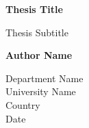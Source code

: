 \begin{titlepage}
    \begin{center}
        \vspace*{1cm}
            
        \Huge
        \textbf{Thesis Title}
            
        \vspace{0.5cm}
        \LARGE
        Thesis Subtitle
            
        \vspace{1.5cm}
            
        \textbf{Author Name}
            
        \vfill
            
            
        \vspace{0.8cm}
            
            
        \Large
        Department Name\\
        University Name\\
        Country\\
        Date

    \end{center}
\end{titlepage}

\tableofcontents
